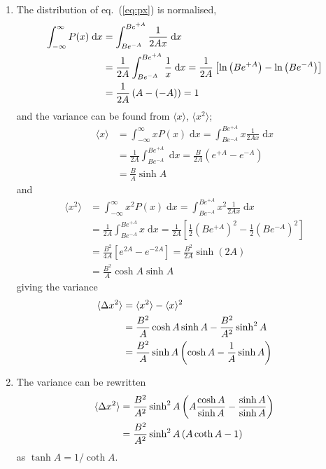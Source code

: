 \documentclass[a4paper,11pt]{article}
\newcommand{\diff}{\ensuremath{\; \text{d}}}
\begin{document}
\begin{enumerate}
    \item The distribution of eq.~(\ref{eq:px}) is normalised,
        \begin{align*}
            \int_{-\infty}^{\infty} P(x) \diff x &= \int_{Be^{-A}}^{Be^{+A}} \frac{1}{2Ax} \diff x \notag \\
            &=  \frac{1}{2A}\int_{Be^{-A}}^{Be^{+A}} \frac{1}{x} \diff x = \frac{1}{2A} \left[ \ln \left( Be^{+A} \right) - \ln \left( Be^{-A} \right) \right] \notag \\
            &=  \frac{1}{2A} \left( A - (-A) \right) = 1
        \end{align*}
        and the variance can be found from $\langle x \rangle$, $\langle x^2 \rangle$;
        \begin{align*}
            \langle x \rangle &= \int_{-\infty}^{\infty} x P(x) \diff x = \int_{Be^{-A}}^{Be^{+A}} x \frac{1}{2Ax} \diff x \\
            &=\frac{1}{2A}\int_{Be^{-A}}^{Be^{+A}} \diff x = \frac{B}{2A} \left( e^{+A} - e^{-A}  \right) \\
            &= \frac{B}{A} \sinh A
        \end{align*}
        and
        \begin{align*}
            \langle x^2 \rangle &= \int_{-\infty}^{\infty} x^2 P(x) \diff x = \int_{Be^{-A}}^{Be^{+A}} x^2 \frac{1}{2Ax} \diff x \\
            &=\frac{1}{2A}\int_{Be^{-A}}^{Be^{+A}} x \diff x = \frac{1}{2A} \left[ \frac{1}{2} (Be^{+A})^2 - \frac{1}{2}(Be^{-A})^2  \right] \\
            &= \frac{B^2}{4A} \left[ e^{2A} - e^{-2A} \right] = \frac{B^2}{2A} \sinh \left( 2A \right) \\
            &= \frac{B^2}{A} \cosh A \sinh A
        \end{align*}
        giving the variance 
        \begin{align}
        \langle \Delta x^2 \rangle &= \langle x^2 \rangle - \langle x \rangle^2 \notag \\
        &= \frac{B^2}{A} \cosh A \sinh A - \frac{B^2}{A^2} \sinh^2 A \notag \\
        &= \frac{B^2}{A} \sinh A \left( \cosh A - \frac{1}{A} \sinh A \right)
            \label{eq:var_1}
        \end{align}

    \item The variance can be rewritten
        \begin{align}
            \langle \Delta x^2 \rangle &= \frac{B^2}{A^2} \sinh^2 A \left( A \frac{\cosh A}{\sinh A} -\frac{\sinh A}{\sinh A} \right) \notag \\
            &= \frac{B^2}{A^2} \sinh^2 A \left( A \coth A - 1 \right)
            \label{eq:var_2}
        \end{align}
        as $\tanh A = 1/\coth A$. 


\end{enumerate}
\end{document}
